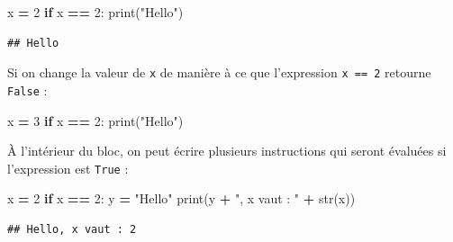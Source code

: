 \documentclass[
  12pt,
]{book}
\newenvironment{Shaded}{\begin{snugshade}}{\end{snugshade}}
\newcommand{\BuiltInTok}[1]{#1}
\newcommand{\ControlFlowTok}[1]{\textcolor[rgb]{0.13,0.29,0.53}{\textbf{#1}}}
\newcommand{\DecValTok}[1]{\textcolor[rgb]{0.00,0.00,0.81}{#1}}
\newcommand{\NormalTok}[1]{#1}
\newcommand{\OperatorTok}[1]{\textcolor[rgb]{0.81,0.36,0.00}{\textbf{#1}}}
\newcommand{\StringTok}[1]{\textcolor[rgb]{0.31,0.60,0.02}{#1}}
\numberwithin{equation}{section}
\numberwithin{countremarque}{section}
\begin{document}
\begin{Shaded}
\begin{Highlighting}[]
\NormalTok{x }\OperatorTok{=} \DecValTok{2}
\ControlFlowTok{if}\NormalTok{ x }\OperatorTok{==} \DecValTok{2}\NormalTok{:}
  \BuiltInTok{print}\NormalTok{(}\StringTok{"Hello"}\NormalTok{)}
\end{Highlighting}
\end{Shaded}

\begin{lstlisting}
## Hello
\end{lstlisting}

Si on change la valeur de \texttt{x} de manière à ce que l'expression \texttt{x\ ==\ 2} retourne \texttt{False} :

\begin{Shaded}
\begin{Highlighting}[]
\NormalTok{x }\OperatorTok{=} \DecValTok{3}
\ControlFlowTok{if}\NormalTok{ x }\OperatorTok{==} \DecValTok{2}\NormalTok{:}
  \BuiltInTok{print}\NormalTok{(}\StringTok{"Hello"}\NormalTok{)}
\end{Highlighting}
\end{Shaded}

À l'intérieur du bloc, on peut écrire plusieurs instructions qui seront évaluées si l'expression est \texttt{True} :

\begin{Shaded}
\begin{Highlighting}[]
\NormalTok{x }\OperatorTok{=} \DecValTok{2}
\ControlFlowTok{if}\NormalTok{ x }\OperatorTok{==} \DecValTok{2}\NormalTok{:}
\NormalTok{  y }\OperatorTok{=} \StringTok{"Hello"}
  \BuiltInTok{print}\NormalTok{(y }\OperatorTok{+} \StringTok{", x vaut : "} \OperatorTok{+} \BuiltInTok{str}\NormalTok{(x))}
\end{Highlighting}
\end{Shaded}

\begin{lstlisting}
## Hello, x vaut : 2
\end{lstlisting}
\end{document}
